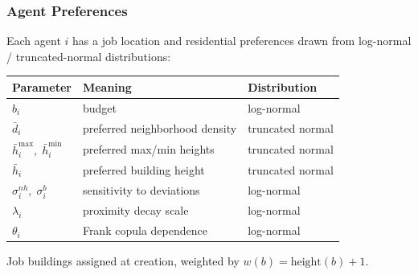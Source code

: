 \documentclass{beamer}
\begin{document}
\begin{frame}
  \frametitle{Agent Preferences}
  Each agent $i$ has a job location and residential preferences drawn from
  log-normal / truncated-normal distributions:
  \vspace{0.3em}
  \begin{center}
  \begin{tabular}{lll}
    \toprule
    \textcolor{nimbygray}{Parameter} & \textcolor{nimbygray}{Meaning} & \textcolor{nimbygray}{Distribution} \\
    \midrule
    $b_i$ & budget & log-normal \\
    $\bar{d}_i$ & preferred neighborhood density & truncated normal \\
    $\bar{h}^{\max}_i,\; \bar{h}^{\min}_i$ & preferred max/min heights & truncated normal \\
    $\bar{h}_i$ & preferred building height & truncated normal \\
    $\sigma^{nh}_i,\; \sigma^{b}_i$ & sensitivity to deviations & log-normal \\
    $\lambda_i$ & proximity decay scale & log-normal \\
    $\theta_i$ & Frank copula dependence & log-normal \\
    \bottomrule
  \end{tabular}
  \end{center}
  \vspace{0.4em}
  \small Job buildings assigned at creation, weighted by $w(b) = \text{height}(b) + 1$.
\end{frame}
\end{document}
